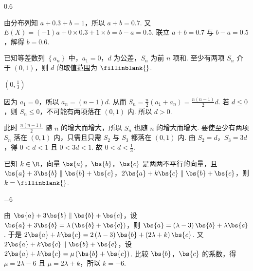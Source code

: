 \begin{answer}
\(0.6\)
\end{answer}

\begin{solution}
由分布列知 \( a+0.3+b=1 \)，所以 \( a+b=0.7 \). 又 \( E\left( X \right)=\left( -1 \right)a+0\times 0.3+1\times b=b-a=0.5 \). 联立 \( a+b=0.7 \) 与 \( b-a=0.5 \)，解得 \( b=0.6 \).
\end{solution}

\begin{problem}
已知等差数列 \( \left\{ a_n \right\} \) 中，\( a_1=0 \)，\( d \) 为公差，\( S_n \) 为前 \( n \) 项和. 至少有两项 \( S_n \) 介于 \( \left( 0,1 \right) \)，则 \( d \) 的取值范围为 \(\fillinblank{} \).
\end{problem}

\begin{answer}
\(\left( 0,\frac{1}{3} \right)\)
\end{answer}

\begin{solution}
因为 \( a_1=0 \)，所以 \( a_n=\left( n-1 \right)d \). 从而 \( S_n=\frac{n}{2}\left( a_1+a_n \right)=\frac{n\left( n-1 \right)}{2}d \).
若 \( d\le 0 \)，则 \( S_n\le 0 \)，不可能有两项落在 \( \left( 0,1 \right) \) 内. 所以 \( d>0 \).

此时 \( \frac{n\left( n-1 \right)}{2} \) 随 \( n \) 的增大而增大，所以 \( S_n \) 也随 \( n \) 的增大而增大. 要使至少有两项 \( S_n \) 落在 \( \left( 0,1 \right) \) 内，只需且只需 \(S_2\) 与 \(S_3\) 都落在 \( \left( 0,1 \right) \) 内.
由 \( S_2=d \)，\( S_3=3d \)，得 \( 0<d<1 \) 且 \( 0<3d<1 \). 故 \( 0<d<\frac{1}{3} \).
\end{solution}

\begin{problem}
已知 \( k\in \R \)，向量 \( \bs{a} \)，\( \bs{b} \)，\( \bs{c} \) 是两两不平行的向量，且 \( \bs{a}+3\bs{b}\parallel \bs{b}+\bs{c} \)，\( 2\bs{a}+k\bs{c}\parallel \bs{b}+\bs{c} \)，则 \( k=\fillinblank{} \).
\end{problem}

\begin{answer}
\(-6\)
\end{answer}

\begin{solution}
由 \( \bs{a}+3\bs{b}\parallel \bs{b}+\bs{c} \)，设 \( \bs{a}+3\bs{b}=\lambda \left( \bs{b}+\bs{c} \right) \)，则 \( \bs{a}=\left( \lambda-3 \right)\bs{b}+\lambda \bs{c} \). 于是 \( 2\bs{a}+k\bs{c}=2\left( \lambda-3 \right)\bs{b}+\left( 2\lambda+k \right)\bs{c} \).
又 \( 2\bs{a}+k\bs{c}\parallel \bs{b}+\bs{c} \)，设 \( 2\bs{a}+k\bs{c}=\mu \left( \bs{b}+\bs{c} \right) \). 比较 \( \bs{b} \)，\( \bs{c} \) 的系数，得 \( \mu=2\lambda-6 \) 且 \( \mu=2\lambda+k \)，所以 \( k=-6 \).
\end{solution}

